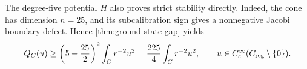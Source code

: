 The degree-five potential \(H\) also proves strict stability directly.
Indeed, the cone has dimension \(n=25\), and its subcalibration sign
gives a nonnegative Jacobi boundary defect. Hence
\cref{thm:ground-state-gap} yields
\[
 Q_C(u)\geq\left(5-\frac{25}{2}\right)^2\int_Cr^{-2}u^2
       =\frac{225}{4}\int_Cr^{-2}u^2,
 \qquad u\in C_c^\infty(C_{\mathrm{reg}}\setminus\{0\}).
\]
